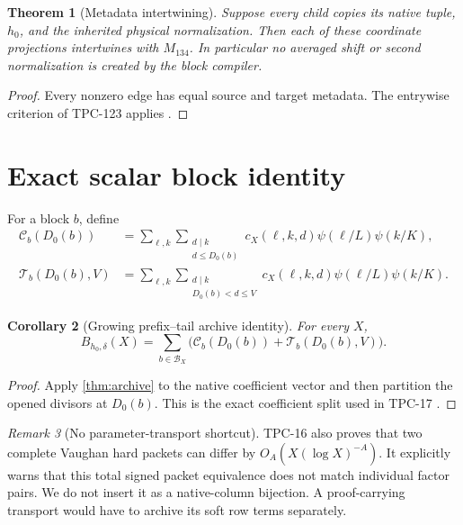 \documentclass[11pt]{article}
\newtheorem{theorem}{Theorem}[section]
\newtheorem{corollary}[theorem]{Corollary}
\theoremstyle{definition}
\theoremstyle{remark}
\newtheorem{remark}[theorem]{Remark}
\newcommand{\B}{\mathcal B}
\newcommand{\Cpre}{\mathcal C}
\newcommand{\Ttail}{\mathcal T}
\begin{document}
\begin{theorem}[Metadata intertwining]
\label{thm:metadata}
Suppose every child copies its native tuple, \(h_0\), and the inherited
physical normalization.  Then each of these coordinate projections
intertwines with \(M_{134}\).  In particular no averaged shift or
second normalization is created by the block compiler.
\end{theorem}

\begin{proof}
Every nonzero edge has equal source and target metadata.  The
entrywise criterion of TPC-123 applies \citep{WangTPC123}.
\end{proof}

\section{Exact scalar block identity}

For a block \(b\), define
\begin{align*}
 \Cpre_b(D_0(b))
 &=
 \sum_{\ell,k}
 \sum_{\substack{d\mid k\\d\le D_0(b)}}
 c_X(\ell,k,d)\psi(\ell/L)\psi(k/K),\\
 \Ttail_b(D_0(b),V)
 &=
 \sum_{\ell,k}
 \sum_{\substack{d\mid k\\D_0(b)<d\le V}}
 c_X(\ell,k,d)\psi(\ell/L)\psi(k/K).
\end{align*}

\begin{corollary}[Growing prefix--tail archive identity]
\label{cor:identity}
For every \(X\),
\[
 \boxed{
 B_{h_0,\delta}(X)=
 \sum_{b\in\B_X}
 \bigl(\Cpre_b(D_0(b))+\Ttail_b(D_0(b),V)\bigr).}
\]
\end{corollary}

\begin{proof}
Apply \cref{thm:archive} to the native coefficient vector and then
partition the opened divisors at \(D_0(b)\).  This is the exact
coefficient split used in TPC-17 \citep{WangTPC16,WangTPC17}.
\end{proof}

\begin{remark}[No parameter-transport shortcut]
TPC-16 also proves that two complete Vaughan hard packets can differ
by \(O_A(X(\log X)^{-A})\).  It explicitly warns that this total signed
packet equivalence does not match individual factor pairs.  We do not
insert it as a native-column bijection.  A proof-carrying transport
would have to archive its soft row terms separately.
\end{remark}
\end{document}
